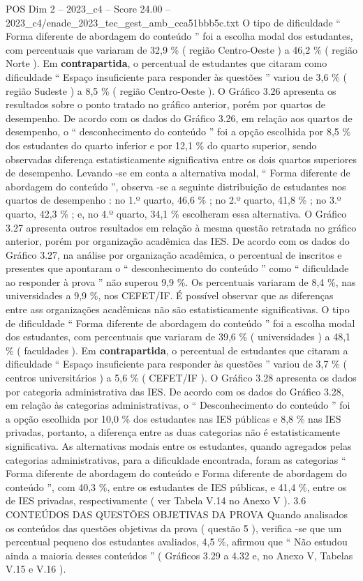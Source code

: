 \begin{textsample}{POS Dim 2 – 2023\_c4 – Score 24.00 – 2023\_c4/enade\_2023\_tec\_gest\_amb\_cca51bbb5c.txt}
O tipo de dificuldade “ Forma diferente de abordagem do conteúdo ” foi a escolha modal dos estudantes, com percentuais que variaram de 32,9 \% ( região Centro-Oeste ) a 46,2 \% ( região Norte ).
Em \textbf{contrapartida}, o percentual de estudantes que citaram como dificuldade “ Espaço insuficiente para responder às questões ” variou de 3,6 \% ( região Sudeste ) a 8,5 \% ( região Centro-Oeste ).
O Gráfico 3.26 apresenta os resultados sobre o ponto tratado no gráfico anterior, porém por quartos de desempenho.
De acordo com os dados do Gráfico 3.26, em relação aos quartos de desempenho, o “ desconhecimento do conteúdo ” foi a opção escolhida por 8,5 \% dos estudantes do quarto inferior e por 12,1 \% do quarto superior, sendo observadas diferença estatisticamente significativa entre os dois quartos superiores de desempenho.
Levando -se em conta a alternativa modal, “ Forma diferente de abordagem do conteúdo ”, observa -se a seguinte distribuição de estudantes nos quartos de desempenho : no 1.º quarto, 46,6 \% ; no 2.º quarto, 41,8 \% ; no 3.º quarto, 42,3 \% ; e, no 4.º quarto, 34,1 \% escolheram essa alternativa.
O Gráfico 3.27 apresenta outros resultados em relação à mesma questão retratada no gráfico anterior, porém por organização acadêmica das IES.
De acordo com os dados do Gráfico 3.27, na análise por organização acadêmica, o percentual de inscritos e presentes que apontaram o “ desconhecimento do conteúdo ” como “ dificuldade ao responder à prova ” não superou 9,9 \%.
Os percentuais variaram de 8,4 \%, nas universidades a 9,9 \%, nos CEFET/IF.
É possível observar que as diferenças entre ass organizações acadêmicas não são estatisticamente significativas.
O tipo de dificuldade “ Forma diferente de abordagem do conteúdo ” foi a escolha modal dos estudantes, com percentuais que variaram de 39,6 \% ( universidades ) a 48,1 \% ( faculdades ).
Em \textbf{contrapartida}, o percentual de estudantes que citaram a dificuldade “ Espaço insuficiente para responder às questões ” variou de 3,7 \% ( centros universitários ) a 5,6 \% ( CEFET/IF ).
O Gráfico 3.28 apresenta os dados por categoria administrativa das IES.
De acordo com os dados do Gráfico 3.28, em relação às categorias administrativas, o “ Desconhecimento do conteúdo ” foi a opção escolhida por 10,0 \% dos estudantes nas IES públicas e 8,8 \% nas IES privadas, portanto, a diferença entre as duas categorias não é estatisticamente significativa.
As alternativas modais entre os estudantes, quando agregados pelas categorias administrativas, para a dificuldade encontrada, foram as categorias “ Forma diferente de abordagem do conteúdo e Forma diferente de abordagem do conteúdo ”, com 40,3 \%, entre os estudantes de IES públicas, e 41,4 \%, entre os de IES privadas, respectivamente ( ver Tabela V.14 no Anexo V ). 3.6 CONTEÚDOS DAS QUESTÕES OBJETIVAS DA PROVA Quando analisados os conteúdos das questões objetivas da prova ( questão 5 ), verifica -se que um percentual pequeno dos estudantes avaliados, 4,5 \%, afirmou que “ Não estudou ainda a maioria desses conteúdos ” ( Gráficos 3.29 a 4.32 e, no Anexo V, Tabelas V.15 e V.16 ).

\end{textsample}
